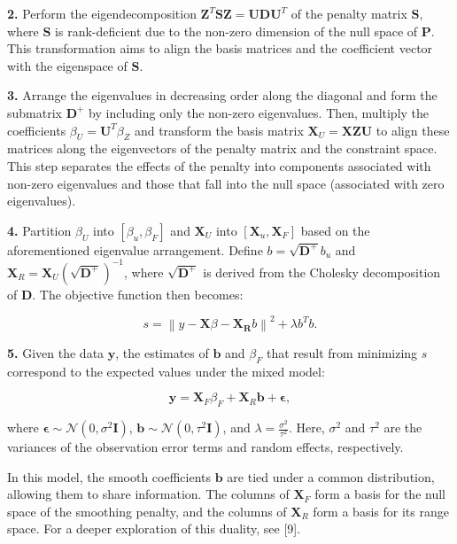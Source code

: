 \documentclass[
11pt, %
oneside, %
english, %
singlespacing, %
]{macthesis} %
\begin{document}
\textbf{2.} Perform the eigendecomposition \(\mathbf{Z}^T\mathbf{SZ} = \mathbf{UD}\mathbf{U}^T\) of the penalty matrix \(\mathbf{S}\), where \(\mathbf{S}\) is rank-deficient due to the non-zero dimension of the null space of \(\mathbf{P}\). This transformation aims to align the basis matrices and the coefficient vector with the eigenspace of \(\mathbf{S}\).

\textbf{3.} Arrange the eigenvalues in decreasing order along the diagonal and form the submatrix \(\mathbf{D}^+\) by including only the non-zero eigenvalues. Then, multiply the coefficients \(\beta_U = \mathbf{U}^T\beta_Z\) and transform the basis matrix \(\mathbf{X}_U = \mathbf{XZU}\) to align these matrices along the eigenvectors of the penalty matrix and the constraint space. This step separates the effects of the penalty into components associated with non-zero eigenvalues and those that fall into the null space (associated with zero eigenvalues).

\textbf{4.} Partition \(\beta_U\) into \([\beta_u, \beta_F]\) and \(\mathbf{X}_U\) into \([\mathbf{X}_u, \mathbf{X}_F]\) based on the aforementioned eigenvalue arrangement. Define \(b = \sqrt{\mathbf{D}^+} b_u\) and \(\mathbf{X}_R = \mathbf{X}_U(\sqrt{\mathbf{D}^+})^{-1}\), where \(\sqrt{\mathbf{D}^+}\) is derived from the Cholesky decomposition of \(\mathbf{D}\). The objective function then becomes:

\begin{equation}
s = \left\lVert y - \mathbf{X}\beta - \mathbf{X_R} b \right\rVert^2 + \lambda b^T b.
\label{eq: mixed effect}
\end{equation}

\textbf{5.} Given the data \(\mathbf{y}\), the estimates of \(\mathbf{b}\) and \(\beta_F\) that result from minimizing \(s\) correspond to the expected values under the mixed model:

\begin{equation}
\mathbf{y} = \mathbf{X}_F \beta_F + \mathbf{X}_R \mathbf{b} + \mathbf{\epsilon},
\label{eq:mixed model}
\end{equation}

where \(\mathbf{\epsilon} \sim \mathcal{N}(0, \sigma^2 \mathbf{I})\), \(\mathbf{b} \sim \mathcal{N}(0, \tau^2 \mathbf{I})\), and \(\lambda = \frac{\sigma^2}{\tau^2}\). Here, \(\sigma^2\) and \(\tau^2\) are the variances of the observation error terms and random effects, respectively.

In this model, the smooth coefficients \(\textbf{b}\) are tied under a common distribution, allowing them to share information. The columns of \(\mathbf{X}_F\) form a basis for the null space of the smoothing penalty, and the columns of \(\mathbf{X}_R\) form a basis for its range space. For a deeper exploration of this duality, see {[}9{]}.
\end{document}
